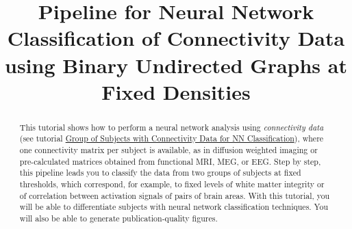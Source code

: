 \documentclass[justified]{tufte-handout}
\title[Neural Networks Classification of Connectivity Data using BUD]{Pipeline for Neural Network Classification of Connectivity Data using Binary Undirected Graphs at Fixed Densities}
\begin{document}
\maketitle

\begin{abstract}
\noindent
This tutorial shows how to perform a neural network analysis using \emph{connectivity data} (see tutorial \href{https://github.com/braph-software/BRAPH-2/tree/develop/tutorials/general/tut_gr_con_nn/tut_gr_con_nn.pdf}{Group of Subjects with Connectivity Data for NN Classification}), where one connectivity matrix per subject is available, as in diffusion weighted imaging or pre-calculated matrices obtained from functional MRI, MEG, or EEG. Step by step, this pipeline leads you to classify the data from two groups of subjects at fixed thresholds, which correspond, for example, to fixed levels of white matter integrity or of correlation between activation signals of pairs of brain areas.  With this tutorial, you will be able to differentiate subjects with neural network classification techniques. You will also be able to generate publication-quality figures.
\end{abstract}
\end{document}
